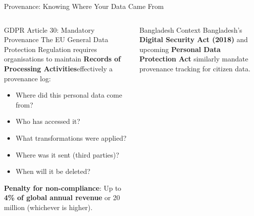 \documentclass[aspectratio=169,10pt]{beamer}
\begin{document}
\begin{frame}{Provenance: Knowing Where Your Data Came From}
\begin{columns}[T]
      \begin{alertblock}{GDPR Article 30: Mandatory Provenance}
        The EU General Data Protection Regulation requires organisations to maintain \textbf{Records of Processing Activities}\textemdash effectively a provenance log:
        \vspace{4pt}
        \begin{itemize}
          \small
          \item Where did this personal data come from?
          \item Who has accessed it?
          \item What transformations were applied?
          \item Where was it sent (third parties)?
          \item When will it be deleted?
        \end{itemize}
        \vspace{4pt}
        \textbf{Penalty for non-compliance}: Up to \textbf{4\% of global annual revenue} or \texteuro{}20 million (whichever is higher).
      \end{alertblock}
      \vspace{4pt}
      \begin{block}{Bangladesh Context}
        Bangladesh's \textbf{Digital Security Act (2018)} and upcoming \textbf{Personal Data Protection Act} similarly mandate provenance tracking for citizen data.
      \end{block}
  \end{columns}
\end{frame}
\end{document}

